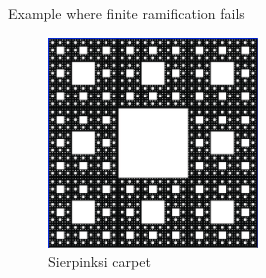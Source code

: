 \begin{frame}{Example where finite ramification fails}
    \begin{figure}
        \includegraphics[height=15em]{images/carpet.pdf}
        \caption{Sierpinksi carpet}
    \end{figure}
\end{frame}

